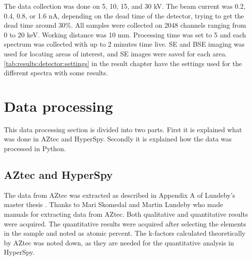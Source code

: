 The data collection was done on 5, 10, 15, and 30 kV.
The beam current was 0.2, 0.4, 0.8, or 1.6 nA, depending on the dead time of the detector, trying to get the dead time around 30\%.
All samples were collected on 2048 channels ranging from 0 to 20 keV.
Working distance was 10 mm.
Processing time was set to 5 and each spectrum was collected with up to 2 minutes time live.
SE and BSE imaging was used for locating areas of interest, and SE images were saved for each area.
\cref{tab:results:detector:settings} in the result chapter have the settings used for the different spectra with some results.


%
%
\section{Data processing}
\label{sec:method:data_processing}

This data processing section is divided into two parts.
First it is explained what was done in AZtec and HyperSpy.
Secondly it is explained how the data was processed in Python.

\subsection{AZtec and HyperSpy}
\label{sec:method:data_processing:aztec_hyperspy}

The data from AZtec was extracted as described in Appendix A of Lundeby's master thesis \cite{lundeby_improving_2019}.
Thanks to Mari Skomedal \cite{skomedal_improving_2022} and Martin Lundeby \cite{lundeby_improving_2019} who made manuals for extracting data from AZtec.
Both qualitative and quantitative results were acquired.
The quantitative results were acquired after selecting the elements in the sample and noted as atomic percent.
The k-factors calculated theoretically by AZtec was noted down, as they are needed for the quantitative analysis in HyperSpy.

